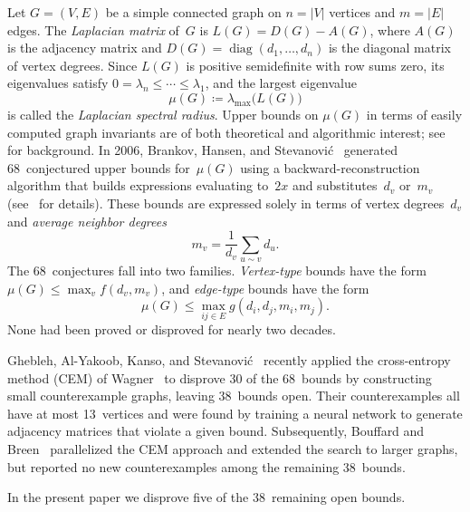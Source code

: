 \documentclass[preprint,12pt]{elsarticle}
\theoremstyle{definition}
\theoremstyle{remark}
\newcommand{\Lspec}{\mu}               %
\begin{document}
Let $G = (V, E)$ be a simple connected graph on $n = |V|$ vertices and
$m = |E|$ edges. The \emph{Laplacian matrix} of~$G$ is
$L(G) = D(G) - A(G)$, where $A(G)$ is the adjacency matrix and
$D(G) = \operatorname{diag}(d_1, \ldots, d_n)$ is the diagonal matrix of
vertex degrees. Since $L(G)$ is positive semidefinite with row sums zero,
its eigenvalues satisfy $0 = \lambda_n \leq \cdots \leq \lambda_1$, and
the largest eigenvalue
\begin{equation}\label{eq:mu-def}
  \Lspec(G) \coloneqq \lambda_{\max}\bigl(L(G)\bigr)
\end{equation}
is called the \emph{Laplacian spectral radius}. Upper bounds on
$\Lspec(G)$ in terms of easily computed graph invariants are of both
theoretical and algorithmic interest; see~\cite{BrouwerHaemers2012} for
background. In 2006, Brankov, Hansen, and
Stevanovi\'{c}~\cite{BHS2006} generated 68~conjectured upper bounds
for~$\Lspec(G)$ using a backward-reconstruction algorithm that builds
expressions evaluating to~$2x$ and substitutes~$d_v$ or~$m_v$
(see~\cite{BHS2006} for details). These bounds are expressed solely
in terms of vertex degrees~$d_v$ and
\emph{average neighbor degrees}
\begin{equation}\label{eq:mv-def}
  m_v = \frac{1}{d_v} \sum_{u \sim v} d_u.
\end{equation}
The 68~conjectures fall into two families.
\emph{Vertex-type} bounds have the form
$\Lspec(G) \leq \max_v f(d_v, m_v)$, and \emph{edge-type}
bounds have the form
\[
  \Lspec(G) \leq \max_{ij\in E} g(d_i, d_j, m_i, m_j).
\]
None had been proved or disproved for nearly two decades.

Ghebleh, Al-Yakoob, Kanso, and Stevanovi\'{c}~\cite{Ghebleh2024}
recently applied the cross-entropy method (CEM) of
Wagner~\cite{Wagner2021} to disprove 30 of the 68~bounds by
constructing small counterexample graphs, leaving 38~bounds open. Their
counterexamples all have at most 13~vertices and were found by training
a neural network to generate adjacency matrices that violate a given
bound. Subsequently, Bouffard and Breen~\cite{BouffardBreen2025}
parallelized the CEM approach and extended the search to larger graphs,
but reported no new counterexamples among the remaining 38~bounds.

In the present paper we disprove five of the 38~remaining open bounds.
\end{document}
